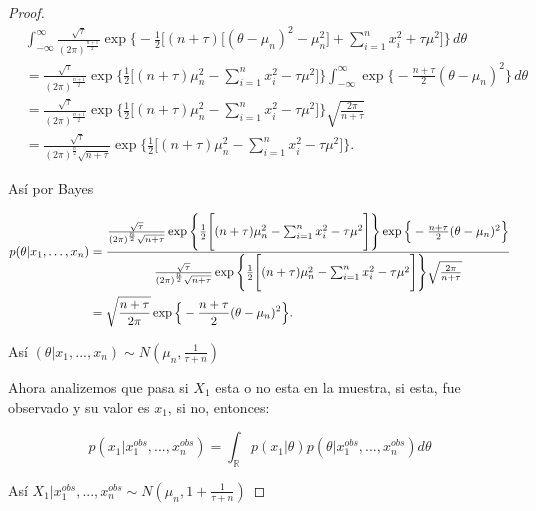 \documentclass[11pt,letterpaper]{article}
\begin{document}
\begin{proof}
    \begin{align*}
        &\int_{-\infty}^{\infty}
        \frac{\sqrt{\tau}}{(2\pi)^{\frac{n+1}{2}}}
        \exp\Bigg\{-\frac{1}{2}\Bigg[
        (n+\tau)\big[(\theta-\mu_n)^2-\mu_n^2\big]
        +\sum_{i=1}^n x_i^2+\tau\mu^2
        \Bigg]\Bigg\}\,d\theta\\
        &=
        \frac{\sqrt{\tau}}{(2\pi)^{\frac{n+1}{2}}}
        \exp\Bigg\{\frac{1}{2}\Bigg[
        (n+\tau)\mu_n^2-\sum_{i=1}^n x_i^2-\tau\mu^2
        \Bigg]\Bigg\}
        \int_{-\infty}^{\infty}
        \exp\Bigg\{-\frac{n+\tau}{2}(\theta-\mu_n)^2\Bigg\}\,d\theta\\
        &=
        \frac{\sqrt{\tau}}{(2\pi)^{\frac{n+1}{2}}}
        \exp\Bigg\{\frac{1}{2}\Bigg[
        (n+\tau)\mu_n^2-\sum_{i=1}^n x_i^2-\tau\mu^2
        \Bigg]\Bigg\}
        \sqrt{\frac{2\pi}{n+\tau}}\\
        &=
        \frac{\sqrt{\tau}}{(2\pi)^{\frac{n}{2}}\sqrt{n+\tau}}
        \exp\Bigg\{\frac{1}{2}\Bigg[
        (n+\tau)\mu_n^2-\sum_{i=1}^n x_i^2-\tau\mu^2
        \Bigg]\Bigg\}.
    \end{align*}

    Así por Bayes

    \begin{align*}
        p(\theta|x_1,\ldots,x_n)
        &=
        \frac{
        \frac{\sqrt{\tau}}{(2\pi)^{\frac{n}{2}}\sqrt{n+\tau}}
        \exp\Bigg\{\frac{1}{2}\Bigg[
        (n+\tau)\mu_n^2-\sum_{i=1}^n x_i^2-\tau\mu^2
        \Bigg]\Bigg\}
        \exp\Big{\{}-\frac{n+\tau}{2}(\theta-\mu_n)^2\Big{\}}
        }{
        \frac{\sqrt{\tau}}{(2\pi)^{\frac{n}{2}}\sqrt{n+\tau}}
        \exp\Bigg\{\frac{1}{2}\Bigg[
        (n+\tau)\mu_n^2-\sum_{i=1}^n x_i^2-\tau\mu^2
        \Bigg]\Bigg\}
        \sqrt{\frac{2\pi}{n+\tau}}
        }\\
        &=
        \sqrt{\frac{n+\tau}{2\pi}}
        \exp\Big{\{}-\frac{n+\tau}{2}(\theta-\mu_n)^2\Big{\}}.
    \end{align*}
    
    Así $(\theta|x_1,...,x_n)\sim N(\mu_n,\frac{1}{\tau+n})$

    Ahora analizemos que pasa si $X_1$ esta o no esta en la muestra, si esta, fue observado y su valor es $x_1$, si no, entonces:

    \begin{equation*}
        p(x_1|x_1^{obs},...,x_n^{obs})=\int_{\mathbb{R}}p(x_1|\theta)p(\theta|x_1^{obs},...,x_n^{obs})d\theta
    \end{equation*}

    Así $X_1|x_1^{obs},...,x_n^{obs} \sim N(\mu_n,1+\frac{1}{\tau+n})$
\end{proof}
\end{document}

